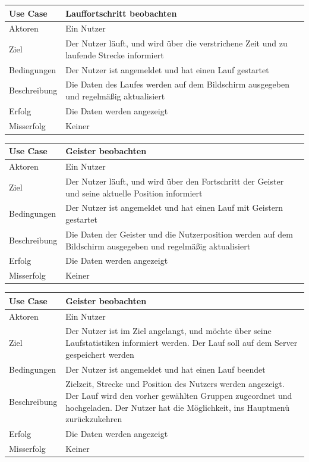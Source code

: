 \begin{tabular}{|p{}|p{}|}
\hline
\textbf{Use Case} & \textbf{Lauffortschritt beobachten} \\ \hline \hline
Aktoren &  Ein Nutzer \\ \hline
Ziel &  Der Nutzer läuft, und wird über die verstrichene Zeit und zu laufende Strecke informiert \\ \hline
Bedingungen &  Der Nutzer ist angemeldet und hat einen Lauf gestartet \\ \hline
Beschreibung & Die Daten des Laufes werden auf dem Bildschirm ausgegeben und regelmäßig aktualisiert \\ \hline
Erfolg & Die Daten werden angezeigt \\ \hline
Misserfolg & Keiner \\ \hline
\hline \end{tabular}
\begin{tabular}{|p{}|p{}|}
\hline
\textbf{Use Case} & \textbf{Geister beobachten} \\ \hline \hline
Aktoren &  Ein Nutzer \\ \hline
Ziel &  Der Nutzer läuft, und wird über den Fortschritt der Geister und seine aktuelle Position informiert \\ \hline
Bedingungen &  Der Nutzer ist angemeldet und hat einen Lauf mit Geistern gestartet \\ \hline
Beschreibung & Die Daten der Geister und die Nutzerposition werden auf dem Bildschirm ausgegeben und regelmäßig aktualisiert \\ \hline
Erfolg & Die Daten werden angezeigt \\ \hline
Misserfolg & Keiner \\ \hline
\hline \end{tabular}
\begin{tabular}{|p{}|p{}|}
\hline
\textbf{Use Case} & \textbf{Geister beobachten} \\ \hline \hline
Aktoren &  Ein Nutzer \\ \hline
Ziel &  Der Nutzer ist im Ziel angelangt, und möchte über seine Laufstatistiken informiert werden. Der Lauf soll auf dem Server gespeichert werden \\ \hline
Bedingungen &  Der Nutzer ist angemeldet und hat einen Lauf beendet \\ \hline
Beschreibung & Zielzeit, Strecke und Position des Nutzers werden angezeigt. Der Lauf wird den vorher gewählten Gruppen zugeordnet und hochgeladen. Der Nutzer hat die Möglichkeit, ins Hauptmenü zurückzukehren \\ \hline
Erfolg & Die Daten werden angezeigt \\ \hline
Misserfolg & Keiner \\ \hline
\hline \end{tabular}

